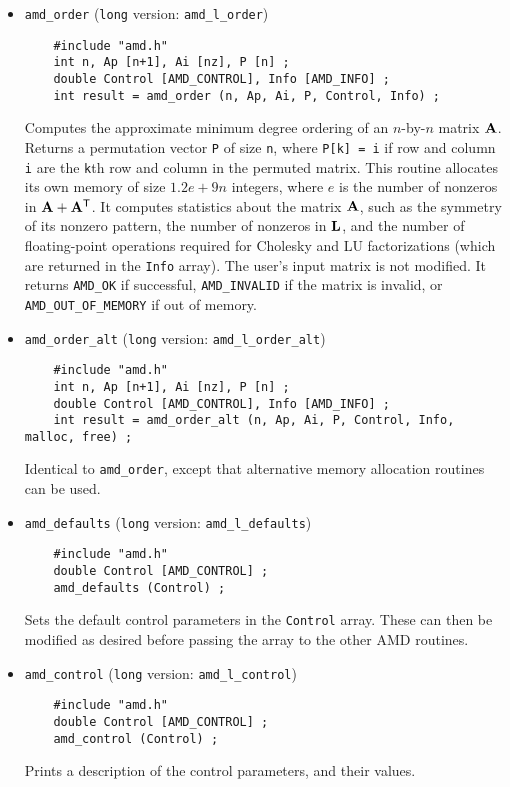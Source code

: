 \documentclass[11pt]{article}
\newcommand{\m}[1]{{\bf{#1}}}       %
\newcommand{\tr}{^{\sf T}}          %
\begin{document}
\begin{itemize}
\item {\tt amd\_order}
({\tt long} version: {\tt amd\_l\_order})
    {\footnotesize
    \begin{verbatim}
    #include "amd.h"
    int n, Ap [n+1], Ai [nz], P [n] ;
    double Control [AMD_CONTROL], Info [AMD_INFO] ;
    int result = amd_order (n, Ap, Ai, P, Control, Info) ;
    \end{verbatim}
    }
    Computes the approximate minimum degree ordering of an $n$-by-$n$ matrix
    $\m{A}$.  Returns a permutation vector {\tt P} of size {\tt n}, where
    {\tt P[k] = i} if row and column {\tt i} are the {\tt k}th row and
    column in the permuted matrix.
    This routine allocates its own memory of size $1.2e+9n$ integers,
    where $e$ is the number of nonzeros in $\m{A}+\m{A}\tr$.
    It computes statistics about the matrix $\m{A}$, such as the symmetry of
    its nonzero pattern, the number of nonzeros in $\m{L}$,
    and the number of floating-point operations required for Cholesky and LU
    factorizations (which are returned in the {\tt Info} array).
    The user's input matrix is not modified.
    It returns {\tt AMD\_OK} if successful, {\tt AMD\_INVALID} if
    the matrix is invalid, or {\tt AMD\_OUT\_OF\_MEMORY} if out of memory.

\item {\tt amd\_order\_alt}
({\tt long} version: {\tt amd\_l\_order\_alt})
    {\footnotesize
    \begin{verbatim}
    #include "amd.h"
    int n, Ap [n+1], Ai [nz], P [n] ;
    double Control [AMD_CONTROL], Info [AMD_INFO] ;
    int result = amd_order_alt (n, Ap, Ai, P, Control, Info, malloc, free) ;
    \end{verbatim}
    } 
    Identical to {\tt amd\_order},
    except that alternative memory
    allocation routines can be used.

\item {\tt amd\_defaults}
({\tt long} version: {\tt amd\_l\_defaults})
    {\footnotesize
    \begin{verbatim}
    #include "amd.h"
    double Control [AMD_CONTROL] ;
    amd_defaults (Control) ;
    \end{verbatim}
    }
    Sets the default control parameters in the {\tt Control} array.  These can
    then be modified as desired before passing the array to the other AMD
    routines.

\item {\tt amd\_control}
({\tt long} version: {\tt amd\_l\_control})
    {\footnotesize
    \begin{verbatim}
    #include "amd.h"
    double Control [AMD_CONTROL] ;
    amd_control (Control) ;
    \end{verbatim}
    }
    Prints a description of the control parameters, and their values.


\end{itemize}
\end{document}
